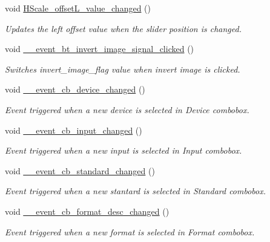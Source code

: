 \begin{DoxyCompactItemize}
void \hyperlink{class_v_s_s_s___g_u_i_1_1_v4_l_interface_a52c94944c17c9ceaba03dd8f2f1849bf}{H\+Scale\+\_\+offset\+L\+\_\+value\+\_\+changed} ()
\begin{DoxyCompactList}\small\item\em Updates the left offset value when the slider position is changed. \end{DoxyCompactList}\item 
void \hyperlink{class_v_s_s_s___g_u_i_1_1_v4_l_interface_a624b2e48483cbf4fa8af562123f68b26}{\+\_\+\+\_\+event\+\_\+bt\+\_\+invert\+\_\+image\+\_\+signal\+\_\+clicked} ()
\begin{DoxyCompactList}\small\item\em Switches invert\+\_\+image\+\_\+flag value when \textquotesingle{}invert image\textquotesingle{} is clicked. \end{DoxyCompactList}\item 
void \hyperlink{class_v_s_s_s___g_u_i_1_1_v4_l_interface_af38c88f726a7ff9fab089ab9ed20c03c}{\+\_\+\+\_\+event\+\_\+cb\+\_\+device\+\_\+changed} ()
\begin{DoxyCompactList}\small\item\em Event triggered when a new device is selected in Device combobox. \end{DoxyCompactList}\item 
void \hyperlink{class_v_s_s_s___g_u_i_1_1_v4_l_interface_a09e546d62cf2363590490c2f9e85c951}{\+\_\+\+\_\+event\+\_\+cb\+\_\+input\+\_\+changed} ()
\begin{DoxyCompactList}\small\item\em Event triggered when a new input is selected in Input combobox. \end{DoxyCompactList}\item 
void \hyperlink{class_v_s_s_s___g_u_i_1_1_v4_l_interface_adaa2a6e1946bb639d5be0ec3eb03cdb5}{\+\_\+\+\_\+event\+\_\+cb\+\_\+standard\+\_\+changed} ()
\begin{DoxyCompactList}\small\item\em Event triggered when a new stantard is selected in Standard combobox. \end{DoxyCompactList}\item 
void \hyperlink{class_v_s_s_s___g_u_i_1_1_v4_l_interface_a41dc791b309dcb6e4469c6cc9d4a4852}{\+\_\+\+\_\+event\+\_\+cb\+\_\+format\+\_\+desc\+\_\+changed} ()
\begin{DoxyCompactList}\small\item\em Event triggered when a new format is selected in Format combobox. \end{DoxyCompactList}\item 

\end{DoxyCompactItemize}
